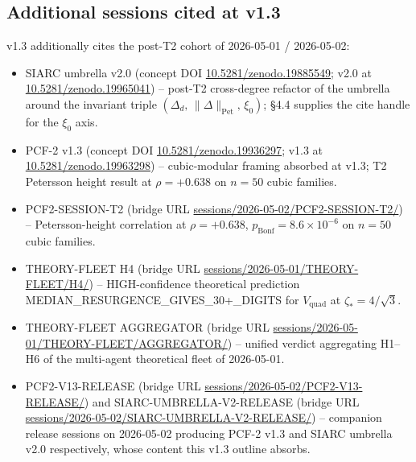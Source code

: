 \documentclass[11pt,reqno]{amsart}
\theoremstyle{plain}
\theoremstyle{definition}
\theoremstyle{remark}
\begin{document}
\subsection{Additional sessions cited at v1.3}
\label{ssec:sessions-v13}
v1.3 additionally cites the post-T2 cohort of 2026-05-01 /
2026-05-02:
\begin{itemize}
\item SIARC umbrella v2.0 \cite{siarc_umbrella_v2} (concept
DOI \href{https://doi.org/10.5281/zenodo.19885549}{10.5281/zenodo.19885549};
v2.0 at \href{https://doi.org/10.5281/zenodo.19965041}{10.5281/zenodo.19965041})
-- post-T2 cross-degree refactor of the umbrella around
the invariant triple
$(\Delta_d,\,\|\Delta\|_{\mathrm{Pet}},\,\xi_0)$;
\S4.4 supplies the cite handle for the $\xi_0$ axis.
\item PCF-2 v1.3 \cite{siarc_pcf2_v13} (concept DOI
\href{https://doi.org/10.5281/zenodo.19936297}{10.5281/zenodo.19936297};
v1.3 at \href{https://doi.org/10.5281/zenodo.19963298}{10.5281/zenodo.19963298})
-- cubic-modular framing absorbed at v1.3; T2 Petersson
height result at $\rho = +0.638$ on $n=50$ cubic families.
\item PCF2-SESSION-T2 \cite{siarc_pcf2_session_t2}
(bridge URL
\href{https://github.com/papanokechi/siarc-relay-bridge/tree/main/sessions/2026-05-02/PCF2-SESSION-T2/}{sessions/2026-05-02/PCF2-SESSION-T2/})
-- Petersson-height correlation at
$\rho = +0.638$, $p_{\mathrm{Bonf}} = 8.6\times 10^{-6}$
on $n=50$ cubic families.
\item THEORY-FLEET H4 \cite{siarc_theory_fleet_h4}
(bridge URL
\href{https://github.com/papanokechi/siarc-relay-bridge/tree/main/sessions/2026-05-01/THEORY-FLEET/H4/}{sessions/2026-05-01/THEORY-FLEET/H4/})
-- HIGH-confidence theoretical prediction
\textsf{MEDIAN\_RESURGENCE\_GIVES\_30+\_DIGITS} for
$V_{\mathrm{quad}}$ at $\zeta_* = 4/\sqrt 3$.
\item THEORY-FLEET AGGREGATOR (bridge URL
\href{https://github.com/papanokechi/siarc-relay-bridge/tree/main/sessions/2026-05-01/THEORY-FLEET/AGGREGATOR/}{sessions/2026-05-01/THEORY-FLEET/AGGREGATOR/})
-- unified verdict aggregating H1--H6 of the multi-agent
theoretical fleet of 2026-05-01.
\item PCF2-V13-RELEASE (bridge URL
\href{https://github.com/papanokechi/siarc-relay-bridge/tree/main/sessions/2026-05-02/PCF2-V13-RELEASE/}{sessions/2026-05-02/PCF2-V13-RELEASE/})
and SIARC-UMBRELLA-V2-RELEASE (bridge URL
\href{https://github.com/papanokechi/siarc-relay-bridge/tree/main/sessions/2026-05-02/SIARC-UMBRELLA-V2-RELEASE/}{sessions/2026-05-02/SIARC-UMBRELLA-V2-RELEASE/})
-- companion release sessions on 2026-05-02 producing
PCF-2 v1.3 and SIARC umbrella v2.0 respectively, whose
content this v1.3 outline absorbs.
\end{itemize}
\end{document}
